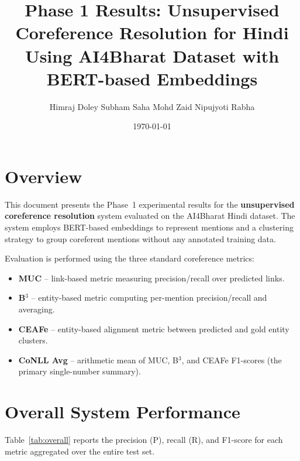 \documentclass[12pt,a4paper]{article}
\title{
    \textbf{Phase 1 Results: Unsupervised Coreference Resolution for Hindi} \\[0.5em]
    \large Using AI4Bharat Dataset with BERT-based Embeddings
}
\author{
    Himraj Doley \quad Subham Saha \quad Mohd Zaid \quad Nipujyoti Rabha
}
\date{\today}
\begin{document}
\maketitle
\tableofcontents
\newpage

\section{Overview}

This document presents the Phase~1 experimental results for the
\textbf{unsupervised coreference resolution} system evaluated on the
AI4Bharat Hindi dataset.  The system employs BERT-based embeddings to
represent mentions and a clustering strategy to group coreferent mentions
without any annotated training data.

Evaluation is performed using the three standard coreference metrics:
\begin{itemize}
    \item \textbf{MUC} -- link-based metric measuring precision/recall over
          predicted links.
    \item \textbf{B$^{3}$} -- entity-based metric computing per-mention
          precision/recall and averaging.
    \item \textbf{CEAFe} -- entity-based alignment metric between predicted
          and gold entity clusters.
    \item \textbf{CoNLL Avg} -- arithmetic mean of MUC, B$^{3}$, and CEAFe
          F1-scores (the primary single-number summary).
\end{itemize}

\section{Overall System Performance}

Table~\ref{tab:overall} reports the precision (P), recall (R), and
F1-score for each metric aggregated over the entire test set.
\end{document}
